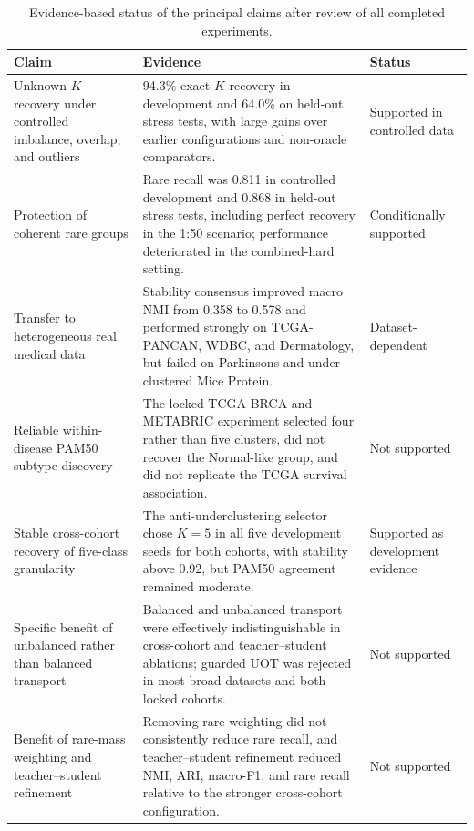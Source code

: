 \begin{table}[t]
\centering
\caption{Evidence-based status of the principal claims after review of all completed experiments.}
\label{tab:claim-status}
\small
\setlength{\tabcolsep}{5pt}
\renewcommand{\arraystretch}{1.12}
\begin{tabularx}{\textwidth}{>{\raggedright\arraybackslash}p{}X>{\raggedright\arraybackslash}p{}}
\toprule
Claim & Evidence & Status \\
\midrule
Unknown-$K$ recovery under controlled imbalance, overlap, and outliers &
94.3\% exact-$K$ recovery in development and 64.0\% on held-out stress tests, with large gains over earlier configurations and non-oracle comparators. &
Supported in controlled data \\
\addlinespace
Protection of coherent rare groups &
Rare recall was 0.811 in controlled development and 0.868 in held-out stress tests, including perfect recovery in the 1:50 scenario; performance deteriorated in the combined-hard setting. &
Conditionally supported \\
\addlinespace
Transfer to heterogeneous real medical data &
Stability consensus improved macro NMI from 0.358 to 0.578 and performed strongly on TCGA-PANCAN, WDBC, and Dermatology, but failed on Parkinsons and under-clustered Mice Protein. &
Dataset-dependent \\
\addlinespace
Reliable within-disease PAM50 subtype discovery &
The locked TCGA-BRCA and METABRIC experiment selected four rather than five clusters, did not recover the Normal-like group, and did not replicate the TCGA survival association. &
Not supported \\
\addlinespace
Stable cross-cohort recovery of five-class granularity &
The anti-underclustering selector chose $K=5$ in all five development seeds for both cohorts, with stability above 0.92, but PAM50 agreement remained moderate. &
Supported as development evidence \\
\addlinespace
Specific benefit of unbalanced rather than balanced transport &
Balanced and unbalanced transport were effectively indistinguishable in cross-cohort and teacher--student ablations; guarded UOT was rejected in most broad datasets and both locked cohorts. &
Not supported \\
\addlinespace
Benefit of rare-mass weighting and teacher--student refinement &
Removing rare weighting did not consistently reduce rare recall, and teacher--student refinement reduced NMI, ARI, macro-F1, and rare recall relative to the stronger cross-cohort configuration. &
Not supported \\
\bottomrule
\end{tabularx}
\end{table}
